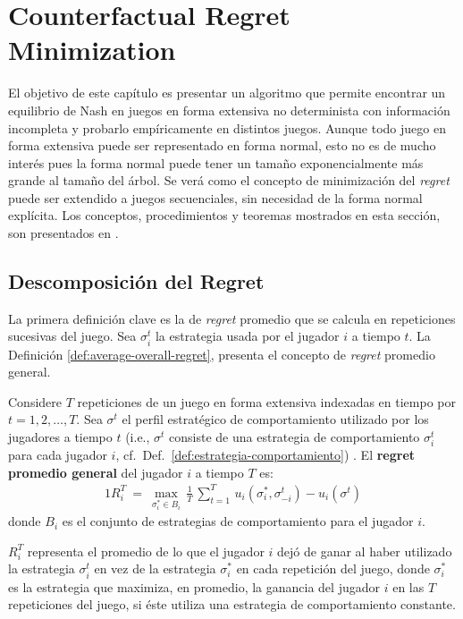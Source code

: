 \chapter{Counterfactual Regret Minimization}
\label{chapter:cfr}

El objetivo de este capítulo es presentar un algoritmo que permite encontrar un equilibrio de Nash en juegos en forma extensiva no determinista con información incompleta y probarlo empíricamente en distintos juegos. Aunque todo juego en forma extensiva puede ser representado en forma normal, esto no es de mucho interés pues la forma normal puede tener un tamaño exponencialmente más grande al tamaño del árbol. Se verá como el concepto de minimización del \textit{regret} puede ser extendido a juegos secuenciales, sin necesidad de la forma normal explícita. Los conceptos, procedimientos y teoremas mostrados en esta sección, son presentados en \cite{bib:cfr}.

\section{Descomposición del Regret}

La primera definición clave es la de \textit{regret} promedio que se calcula en repeticiones sucesivas del juego. Sea $\sigma_i^t$ la estrategia usada por el jugador $i$ a tiempo $t$. La Definición \ref{def:average-overall-regret}, presenta el concepto de \textit{regret} promedio general.

\begin{definition}
\label{def:average-overall-regret}
Considere $T$ repeticiones de un juego en forma extensiva indexadas en tiempo por $t=1,2,\ldots,T$. Sea $\sigma^t$ el perfil estratégico de comportamiento utilizado por los jugadores a tiempo $t$ (i.e., $\sigma^t$ consiste de una estrategia de comportamiento $\sigma^t_i$ para cada jugador $i$, cf.\ Def.~\ref{def:estrategia-comportamiento}) . El \textbf{regret promedio general} del jugador $i$ a tiempo $T$ es:
\begin{alignat}{1}
R_i^T\ =\ \max_{\sigma^*_i \in B_i} \, \frac{1}{T}\, \sum_{t = 1}^T \, u_i(\sigma_i^*, \sigma_{-i}^t) - u_i(\sigma^t)
\end{alignat}
donde $B_i$ es el conjunto de estrategias de comportamiento para el jugador $i$.
\end{definition}

$R_i^T$ representa el promedio de lo que el jugador $i$ dejó de ganar al haber utilizado la estrategia $\sigma^t_i$ en vez de la estrategia $\sigma^*_i$ en cada repetición del juego, donde $\sigma^*_i$ es la estrategia que maximiza, en promedio, la ganancia del jugador $i$ en las $T$ repeticiones del juego, si éste utiliza una estrategia de comportamiento constante.


